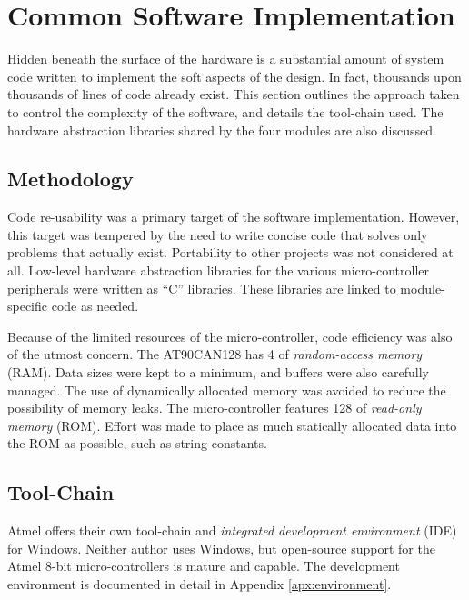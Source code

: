 \section{Common Software Implementation\label{sec:common_software_implementation}}

Hidden beneath the surface of the hardware is a substantial amount of system code written to implement the soft aspects of the design. In fact, thousands upon thousands of lines of code already exist. This section outlines the approach taken to control the complexity of the software, and details the tool-chain used. The hardware abstraction libraries shared by the four modules are also discussed.

\subsection{Methodology}
\label{sec:imp_software_meth}

Code re-usability was a primary target of the software implementation. However, this target was tempered by the need to write concise code that solves only problems that actually exist. Portability to other projects was not considered at all. Low-level hardware abstraction libraries for the various micro-controller peripherals were written as ``C'' libraries. These libraries are linked to module-specific code as needed. 


Because of the limited resources of the micro-controller, code efficiency was also of the utmost concern. The AT90CAN128 has \unit{4}{\kilo\byte} of \emph{random-access memory} (RAM). Data sizes were kept to a minimum, and buffers were also carefully managed. The use of dynamically allocated memory was avoided to reduce the possibility of memory leaks. The micro-controller features \unit{128}{\kilo\byte} of \emph{read-only memory} (ROM). Effort was made to place as much statically allocated data into the ROM as possible, such as string constants.

\subsection{Tool-Chain}

Atmel offers their own tool-chain and \emph{integrated development environment} (IDE) for Windows. Neither author uses Windows, but open-source support for the Atmel 8-bit micro-controllers is mature and capable. The development environment is documented in detail in Appendix \ref{apx:environment}.

